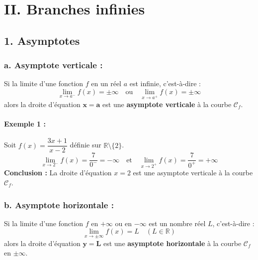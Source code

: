 \documentclass[12pt,a4paper]{article}
\begin{document}
\section*{\color{myred}II. Branches infinies}

\subsection*{\color{myred}1. Asymptotes}

\subsubsection*{\color{myred}a. Asymptote verticale :}

\begin{center}
    \begin{tcolorbox}[colback=blue!5!white,colframe=myblue,title=\textbf{Définition : Asymptote verticale}]
Si la limite d'une fonction $f$ en un réel $a$ est infinie, c'est-à-dire :
\[
\lim_{x \to a^-} f(x) = \pm\infty \quad \text{ou} \quad \lim_{x \to a^+} f(x) = \pm\infty
\]
alors la droite d'équation $\mathbf{x = a}$ est une \textbf{asymptote verticale} à la courbe $\mathcal{C}_f$.
\end{tcolorbox}
\end{center}

\paragraph{Exemple 1 :} Soit $f(x) = \dfrac{3x + 1}{x - 2}$ définie sur $\mathbb{R} \setminus \{2\}$.
\[
\lim_{x \to 2^-} f(x) = \frac{7}{0^-} = -\infty \quad \text{et} \quad \lim_{x \to 2^+} f(x) = \frac{7}{0^+} = +\infty
\]
\textbf{Conclusion :} La droite d'équation $x = 2$ est une asymptote verticale à la courbe $\mathcal{C}_f$.

\subsubsection*{\color{myred}b. Asymptote horizontale :}

\begin{center}
    \begin{tcolorbox}[colback=blue!5!white,colframe=myblue,title=\textbf{Définition : Asymptote horizontale}]
Si la limite d'une fonction $f$ en $+\infty$ ou en $-\infty$ est un nombre réel $L$, c'est-à-dire :
\[
\lim_{x \to \pm\infty} f(x) = L \quad (L \in \mathbb{R})
\]
alors la droite d'équation $\mathbf{y = L}$ est une \textbf{asymptote horizontale} à la courbe $\mathcal{C}_f$ en $\pm\infty$.
\end{tcolorbox}
\end{center}
\end{document}

